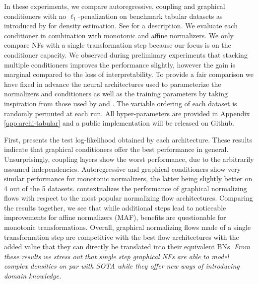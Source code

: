 In these experiments, we compare autoregressive, coupling and graphical conditioners with no $\ell_1$-penalization on benchmark tabular datasets as introduced by \cite{MAF} for density estimation. See  for a description. We evaluate each conditioner in combination with monotonic and affine normalizers.
We only compare NFs with a single transformation step because our focus is on the conditioner capacity. We observed during preliminary experiments that stacking multiple conditioners  improves the performance slightly, however the gain is marginal compared to the loss of interpretability. To provide a fair comparison we have fixed in advance the neural architectures used to parameterize the normalizers and conditioners as well as the training parameters by taking inspiration from those used by \citet{UMNN} and \citet{MAF}. The variable ordering of each dataset is randomly permuted at each run. All hyper-parameters are provided in Appendix \ref{app:archi-tabular} and a public implementation will be released on Github.

First,  presents the test log-likelihood obtained by each architecture. These results indicate that graphical conditioners offer the best performance in general. Unsurprisingly, coupling layers show the worst performance, due to the arbitrarily assumed independencies. Autoregressive and graphical conditioners show very similar performance for monotonic normalizers, the latter being slightly better on 4 out of the 5 datasets.  contextualizes the performance of graphical normalizing flows with respect to the most popular normalizing flow architectures.
Comparing the results together, we see that while additional steps lead to noticeable improvements for affine normalizers (MAF), benefits are questionable for monotonic transformations. Overall, graphical normalizing flows made of a single transformation step are competitive with the best flow architectures with the added value that they can directly be translated into their equivalent BNs. \emph{From these results we stress out that single step graphical NFs are able to model complex densities on par with SOTA while they offer new ways of introducing domain knowledge.}

